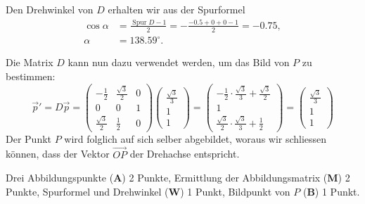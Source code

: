 \begin{loesung}
\begin{teilaufgaben}
\item
Den Drehwinkel von $D$ erhalten wir aus der Spurformel
\begin{align*}
\cos\alpha &= \frac{\operatorname{Spur}D-1}{2} = -\frac{-0.5+0+0-1}{2} = -0.75,
\\
\alpha &=138.59^\circ.
\end{align*}
\item
Die Matrix $D$ kann nun dazu verwendet werden, um das Bild von $P$ zu bestimmen:
\[
\vec p' = D\vec p = 
\begin{pmatrix}
-\frac{1}{2} &\frac{\sqrt{3}}{2}&0\\
0&0&1\\
\frac{\sqrt{3}}{2}&\frac{1}{2}&0
\end{pmatrix}
\begin{pmatrix}
\frac{\sqrt{3}}{3}\\
1\\
1
\end{pmatrix}
= 
\begin{pmatrix}
-\frac{1}{2}\cdot \frac{\sqrt{3}}{3}+\frac{\sqrt{3}}{2}\\
1\\
\frac{\sqrt{3}}{2}\cdot\frac{\sqrt{3}}{3} + \frac{1}{2}
\end{pmatrix}
= 
\begin{pmatrix}
\frac{\sqrt{3}}{3}\\
1\\
1
\end{pmatrix}
\]
Der Punkt $P$ wird folglich auf sich selber abgebildet, 
woraus wir schliessen können, dass der Vektor $\overrightarrow{OP}$
der Drehachse entspricht.
\begin{center}
\end{center}

\end{teilaufgaben}
\end{loesung}

\begin{bewertung}
Drei Abbildungspunkte ({\bf A}) 2 Punkte,
Ermittlung der Abbildungsmatrix ({\bf M}) 2 Punkte,
Spurformel und Drehwinkel ({\bf W}) 1 Punkt,
Bildpunkt von $P$ ({\bf B}) 1 Punkt.
\end{bewertung}

